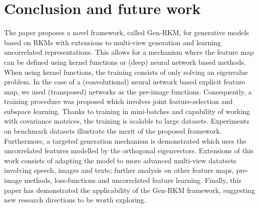 \documentclass[preview,border=0.3pt]{standalone}
\begin{document}
\section{Conclusion and future work \label{sec:conc}}
%
%
The paper proposes a novel framework, called Gen-RKM, for generative models based on RKMs with extensions to multi-view generation and learning uncorrelated representations. This allows for a  mechanism where the feature map can be defined using kernel functions or (deep) neural network based methods. When using kernel functions, the training consists of only solving an eigenvalue problem. In the case of a (convolutional) neural network based explicit feature map, we used (transposed) networks as the pre-image functions. Consequently, a training procedure was proposed which involves joint feature-selection and subspace learning. Thanks to training in mini-batches and capability of working with covariance matrices, the training is scalable to large datasets. Experiments on benchmark datasets illustrate the merit of the proposed framework. Furthermore, a targeted generation mechanism is demonstrated which uses the uncorrelated features modelled by the orthogonal eigenvectors. Extensions of this work consists of adapting the model to more advanced multi-view datatsets involving speech, images and texts; further analysis on other feature maps, pre-image methods, loss-functions and uncorrelated feature learning. Finally, this paper has demonstrated the applicability of the Gen-RKM framework, suggesting new research directions to be worth exploring.
%
\newpage


\newpage
\appendix
\end{document}

